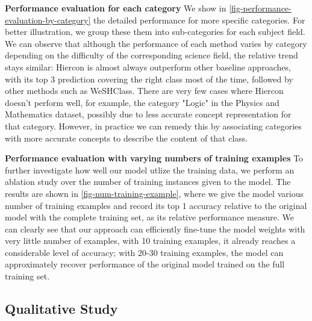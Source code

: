 \noindent \textbf{Performance evaluation for each category}
We show in \autoref{fig-performance-evaluation-by-category} the detailed performance for more specific categories. For better illustration, we group these them into sub-categories for each subject field. 
We can observe that although the performance of each method varies by category depending on the difficulty of the corresponding science field, 
the relative trend stays similar: 
Hiercon is almost always outperform other baseline approaches, with its top 3 prediction covering the right class most of the time, followed by other methods such as WeSHClass. 
There are very few cases where Hiercon doesn't perform well, for example, the category "Logic" in the Physics and Mathematics dataset, possibly due to less accurate concept representation for that category. 
However, in practice we can remedy this by 
associating categories with more accurate concepts to describe the content of that class.




\noindent \textbf{
Performance evaluation with varying numbers of training examples
}
To further investigate how well our model utlize the training data, we perform an ablation study over the number of training instances given to the model. The results are shown in \autoref{fig-num-training-example}, where we give the model various number of training examples and record its top 1 accuracy relative to the original model with the complete training set, as its relative performance measure. We can clearly see that our approach can efficiently fine-tune the model weights with very little number of examples, with 10 training examples, it already reaches a considerable level of accuracy; with 20-30 training examples, the model can approximately recover performance of the original model trained on the full training set.


\subsection{Qualitative Study}






